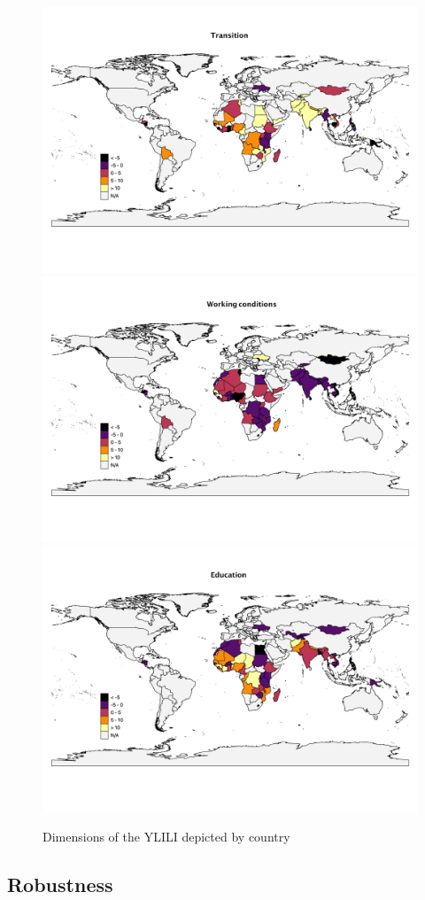 \documentclass[
  a4paper, twoside, 12pt]{book}
\begin{document}
\begin{figure}[H]

{\centering \includegraphics[width=0.69\linewidth,]{figures/maps/diff_transition} \includegraphics[width=0.69\linewidth,]{figures/maps/diff_working_conditions} \includegraphics[width=0.69\linewidth,]{figures/maps/diff_education} 

}

\caption{Dimensions of the YLILI depicted by country}\label{fig:fig-genderdiffmaps}
\end{figure}

\newpage

\hypertarget{altscores}{%
\subsection*{Robustness}\label{altscores}}
\end{document}
